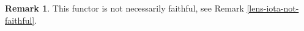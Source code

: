 \documentclass[11pt,a4paper]{article}
\theoremstyle{plain}
\newtheorem{theorem}{Theorem}[subsection]
\theoremstyle{definition}
\newtheorem{remark}[theorem]{Remark}
\newcommand{\C}{\mathscr{C}}
\newcommand{\Optic}{\mathbf{Optic}}
\newcommand{\todo}[1]{\textcolor{red}{\small #1}}
\begin{document}
\begin{remark}
This functor is not necessarily faithful, see Remark \ref{lens-iota-not-faithful}.
\end{remark}


\end{document}
